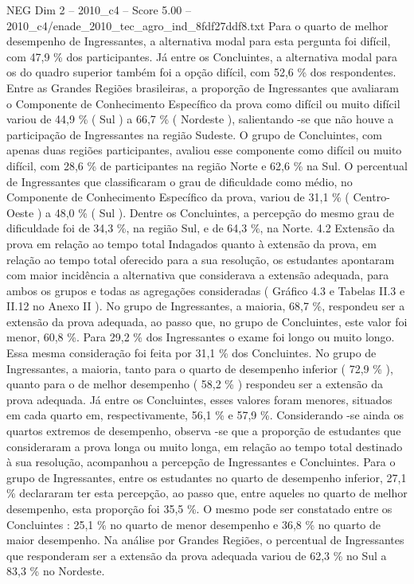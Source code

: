 \begin{textsample}{NEG Dim 2 – 2010\_c4 – Score 5.00 – 2010\_c4/enade\_2010\_tec\_agro\_ind\_8fdf27ddf8.txt}
Para o quarto de melhor desempenho de Ingressantes, a alternativa modal para esta pergunta foi difícil, com 47,9 \% dos participantes.
Já entre os Concluintes, a alternativa modal para os do quadro superior também foi a opção difícil, com 52,6 \% dos respondentes.
Entre as Grandes Regiões brasileiras, a proporção de Ingressantes que avaliaram o Componente de Conhecimento Específico da prova como difícil ou muito difícil variou de 44,9 \% ( Sul ) a 66,7 \% ( Nordeste ), salientando -se que não houve a participação de Ingressantes na região Sudeste.
O grupo de Concluintes, com apenas duas regiões participantes, avaliou esse componente como difícil ou muito difícil, com 28,6 \% de participantes na região Norte e 62,6 \% na Sul.
O percentual de Ingressantes que classificaram o grau de dificuldade como médio, no Componente de Conhecimento Específico da prova, variou de 31,1 \% ( Centro-Oeste ) a 48,0 \% ( Sul ).
Dentre os Concluintes, a percepção do mesmo grau de dificuldade foi de 34,3 \%, na região Sul, e de 64,3 \%, na Norte. 4.2 Extensão da prova em relação ao tempo total Indagados quanto à extensão da prova, em relação ao tempo total oferecido para a sua resolução, os estudantes apontaram com maior incidência a alternativa que considerava a extensão adequada, para ambos os grupos e todas as agregações consideradas ( Gráfico 4.3 e Tabelas II.3 e II.12 no Anexo II ).
No grupo de Ingressantes, a maioria, 68,7 \%, respondeu ser a extensão da prova adequada, ao passo que, no grupo de Concluintes, este valor foi menor, 60,8 \%.
Para 29,2 \% dos Ingressantes o exame foi longo ou muito longo.
Essa mesma consideração foi feita por 31,1 \% dos Concluintes.
No grupo de Ingressantes, a maioria, tanto para o quarto de desempenho inferior ( 72,9 \% ), quanto para o de melhor desempenho ( 58,2 \% ) respondeu ser a extensão da prova adequada.
Já entre os Concluintes, esses valores foram menores, situados em cada quarto em, respectivamente, 56,1 \% e 57,9 \%.
Considerando -se ainda os quartos extremos de desempenho, observa -se que a proporção de estudantes que consideraram a prova longa ou muito longa, em relação ao tempo total destinado à sua resolução, acompanhou a percepção de Ingressantes e Concluintes.
Para o grupo de Ingressantes, entre os estudantes no quarto de desempenho inferior, 27,1 \% declararam ter esta percepção, ao passo que, entre aqueles no quarto de melhor desempenho, esta proporção foi 35,5 \%.
O mesmo pode ser constatado entre os Concluintes : 25,1 \% no quarto de menor desempenho e 36,8 \% no quarto de maior desempenho.
Na análise por Grandes Regiões, o percentual de Ingressantes que responderam ser a extensão da prova adequada variou de 62,3 \% no Sul a 83,3 \% no Nordeste.

\end{textsample}
